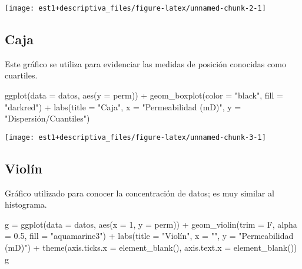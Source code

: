 \documentclass[
]{book}
\newenvironment{Shaded}{\begin{snugshade}}{\end{snugshade}}
\newcommand{\AttributeTok}[1]{\textcolor[rgb]{0.77,0.63,0.00}{#1}}
\newcommand{\DecValTok}[1]{\textcolor[rgb]{0.00,0.00,0.81}{#1}}
\newcommand{\FloatTok}[1]{\textcolor[rgb]{0.00,0.00,0.81}{#1}}
\newcommand{\FunctionTok}[1]{\textcolor[rgb]{0.00,0.00,0.00}{#1}}
\newcommand{\NormalTok}[1]{#1}
\newcommand{\OtherTok}[1]{\textcolor[rgb]{0.56,0.35,0.01}{#1}}
\newcommand{\SpecialCharTok}[1]{\textcolor[rgb]{0.00,0.00,0.00}{#1}}
\newcommand{\StringTok}[1]{\textcolor[rgb]{0.31,0.60,0.02}{#1}}
\begin{document}
\begin{center}\texttt{[image: est1+descriptiva\_files/figure-latex/unnamed-chunk-2-1]} \end{center}

\hypertarget{caja}{%
\subsection{Caja}\label{caja}}

Este gráfico se utiliza para evidenciar las medidas de posición conocidas como cuartiles.

\begin{Shaded}
\begin{Highlighting}[]
\FunctionTok{ggplot}\NormalTok{(}\AttributeTok{data =}\NormalTok{ datos, }\FunctionTok{aes}\NormalTok{(}\AttributeTok{y =}\NormalTok{ perm)) }\SpecialCharTok{+} 
  \FunctionTok{geom\_boxplot}\NormalTok{(}\AttributeTok{color =} \StringTok{"black"}\NormalTok{, }\AttributeTok{fill =} \StringTok{"darkred"}\NormalTok{) }\SpecialCharTok{+}
  \FunctionTok{labs}\NormalTok{(}\AttributeTok{title =} \StringTok{"Caja"}\NormalTok{, }\AttributeTok{x =} \StringTok{"Permeabilidad (mD)"}\NormalTok{, }\AttributeTok{y =} \StringTok{"Dispersión/Cuantiles"}\NormalTok{) }
\end{Highlighting}
\end{Shaded}

\begin{center}\texttt{[image: est1+descriptiva\_files/figure-latex/unnamed-chunk-3-1]} \end{center}

\hypertarget{violuxedn}{%
\subsection{Violín}\label{violuxedn}}

Gráfico utilizado para conocer la concentración de datos; es muy similar al histograma.

\begin{Shaded}
\begin{Highlighting}[]
\NormalTok{g }\OtherTok{=} \FunctionTok{ggplot}\NormalTok{(}\AttributeTok{data =}\NormalTok{ datos, }\FunctionTok{aes}\NormalTok{(}\AttributeTok{x =} \DecValTok{1}\NormalTok{, }\AttributeTok{y =}\NormalTok{ perm)) }\SpecialCharTok{+} 
  \FunctionTok{geom\_violin}\NormalTok{(}\AttributeTok{trim =}\NormalTok{ F, }\AttributeTok{alpha =} \FloatTok{0.5}\NormalTok{, }\AttributeTok{fill =} \StringTok{"aquamarine3"}\NormalTok{) }\SpecialCharTok{+}
  \FunctionTok{labs}\NormalTok{(}\AttributeTok{title =} \StringTok{"Violín"}\NormalTok{, }\AttributeTok{x =} \StringTok{""}\NormalTok{, }\AttributeTok{y =} \StringTok{"Permeabilidad (mD)"}\NormalTok{) }\SpecialCharTok{+} 
  \FunctionTok{theme}\NormalTok{(}\AttributeTok{axis.ticks.x =} \FunctionTok{element\_blank}\NormalTok{(),}
        \AttributeTok{axis.text.x =} \FunctionTok{element\_blank}\NormalTok{())}
\NormalTok{g}
\end{Highlighting}
\end{Shaded}
\end{document}
